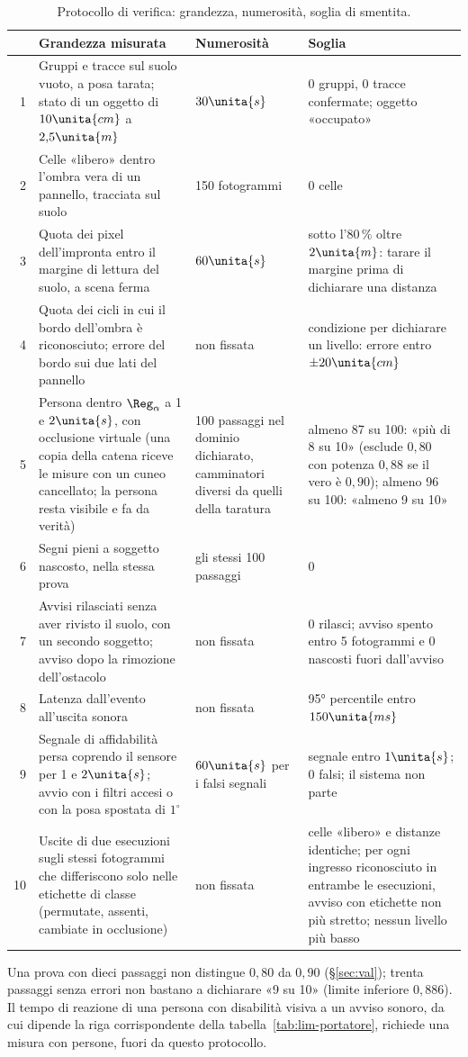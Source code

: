 \begin{table}[H]\centering\footnotesize
\caption{Protocollo di verifica: grandezza, numerosità, soglia di smentita.}\label{tab:lim-misure}
\begin{tabularx}{\linewidth}{@{}rLp{4.0cm}p{4.6cm}@{}}
\toprule
 & Grandezza misurata & Numerosità & Soglia\\
 & Gruppi e tracce sul suolo vuoto, a posa tarata; stato di un oggetto di $10\unita{cm}$ a $2{,}5\unita{m}$ & $30\unita{s}$ & 0 gruppi, 0 tracce confermate; oggetto «occupato»\\
2 & Celle «libero» dentro l'ombra vera di un pannello, tracciata sul suolo & 150 fotogrammi & 0 celle\\
3 & Quota dei pixel dell'impronta entro il margine di lettura del suolo, a scena ferma & $60\unita{s}$ & sotto l'$80\,\%$ oltre $2\unita{m}$: tarare il margine prima di dichiarare una distanza\\
4 & Quota dei cicli in cui il bordo dell'ombra è riconosciuto; errore del bordo sui due lati del pannello & non fissata & condizione per dichiarare un livello: errore entro $\pm20\unita{cm}$\\
5 & Persona dentro $\Reg_\alpha$ a 1 e $2\unita{s}$, con occlusione virtuale (una copia della catena riceve le misure con un cuneo cancellato; la persona resta visibile e fa da verità) & 100 passaggi nel dominio dichiarato, camminatori diversi da quelli della taratura & almeno 87 su 100: «più di 8 su 10» (esclude $0{,}80$ con potenza $0{,}88$ se il vero è $0{,}90$); almeno 96 su 100: «almeno 9 su 10»\\
6 & Segni pieni a soggetto nascosto, nella stessa prova & gli stessi 100 passaggi & 0\\
7 & Avvisi rilasciati senza aver rivisto il suolo, con un secondo soggetto; avviso dopo la rimozione dell'ostacolo & non fissata & 0 rilasci; avviso spento entro 5 fotogrammi e 0 nascosti fuori dall'avviso\\
8 & Latenza dall'evento all'uscita sonora & non fissata & 95° percentile entro $150\unita{ms}$\\
9 & Segnale di affidabilità persa coprendo il sensore per 1 e $2\unita{s}$; avvio con i filtri accesi o con la posa spostata di $1^\circ$ & $60\unita{s}$ per i falsi segnali & segnale entro $1\unita{s}$; 0 falsi; il sistema non parte\\
10 & Uscite di due esecuzioni sugli stessi fotogrammi che differiscono solo nelle etichette di classe (permutate, assenti, cambiate in occlusione) & non fissata & celle «libero» e distanze identiche; per ogni ingresso riconosciuto in entrambe le esecuzioni, avviso con etichette non più stretto; nessun livello più basso\\
\bottomrule
\end{tabularx}
\end{table}

Una prova con dieci passaggi non distingue $0{,}80$ da $0{,}90$ (\S\ref{sec:val}); trenta passaggi senza errori non bastano a dichiarare «9 su 10» (limite inferiore $0{,}886$). Il tempo di reazione di una persona con disabilità visiva a un avviso sonoro, da cui dipende la riga corrispondente della tabella~\ref{tab:lim-portatore}, richiede una misura con persone, fuori da questo protocollo.
